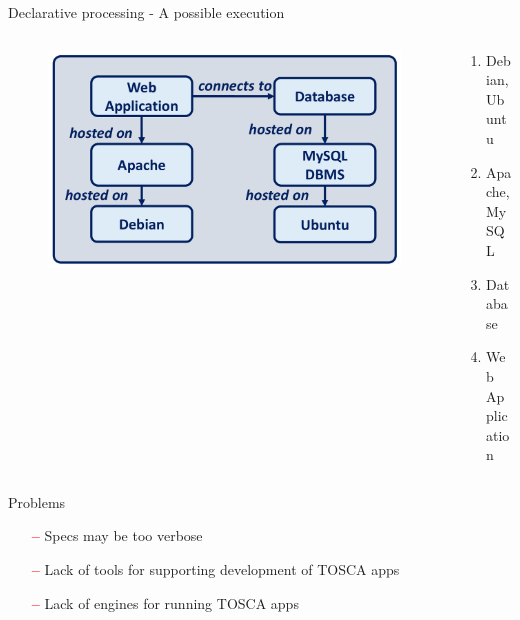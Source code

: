 \documentclass{beamer}
\begin{document}
  \begin{frame}{Declarative processing - A possible execution}
    \begin{columns}[c]
      \begin{column}{.65\textwidth}
        \begin{figure}
          \includegraphics[width=\textwidth]{img/tosca_deploy.png}
        \end{figure}
      \end{column}
      \begin{column}{.35\textwidth}
        \begin{enumerate}
          \item<1-> Debian, Ubuntu
          \item<2-> Apache, MySQL
          \item<3-> Database
          \item<4> Web Application
        \end{enumerate}
      \end{column}
    \end{columns}
  \end{frame}

  \begin{frame}{Problems}
    \begin{itemize}
      \item[\textcolor{red}{\textbf{--}}] Specs may be too verbose
      \item[\textcolor{red}{\textbf{--}}] Lack of tools for supporting development of TOSCA apps
      \item[\textcolor{red}{\textbf{--}}] Lack of engines for running  TOSCA apps
    \end{itemize}
  \end{frame}
\end{document}
